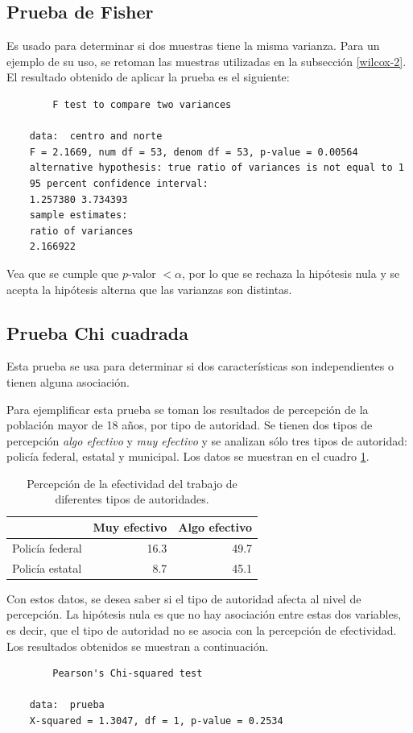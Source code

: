 \documentclass[12pt]{article}
\begin{document}
	\subsection{Prueba de Fisher}
	
	Es usado para determinar si dos muestras tiene la misma varianza. Para un ejemplo de su uso, se retoman las muestras utilizadas en la subsección \ref{wilcox-2}. El resultado obtenido de aplicar la prueba es el siguiente:
	\begin{verbatim}
		F test to compare two variances
	
	data:  centro and norte
	F = 2.1669, num df = 53, denom df = 53, p-value = 0.00564
	alternative hypothesis: true ratio of variances is not equal to 1
	95 percent confidence interval:
	1.257380 3.734393
	sample estimates:
	ratio of variances 
	2.166922 
	\end{verbatim}

	Vea que se cumple que $p$-valor $< \alpha$, por lo que se rechaza la hipótesis nula y se acepta la hipótesis alterna que las varianzas son distintas.
	
	\subsection{Prueba Chi cuadrada}
	
	Esta prueba se usa para determinar si dos características son independientes o tienen alguna asociación. 
	
	Para ejemplificar esta prueba se toman los resultados de percepción de la población mayor de 18 años, por tipo de autoridad. Se tienen dos tipos de percepción {\em algo efectivo} y {\em muy efectivo} y se analizan sólo tres tipos de autoridad: policía federal, estatal y municipal. Los datos se muestran en el cuadro \ref{dtaos-chi}.
	
	\begin{table}[b]
		\centering
		\caption{Percepción de la efectividad del trabajo de diferentes tipos de autoridades.}
		\label{dtaos-chi}
		\begin{tabular}{lrr}
			\hline
			 & Muy efectivo & Algo efectivo\\
			\hline
			Policía federal & 16.3 & 49.7 \\
			Policía estatal & 8.7 & 45.1 \\
			\hline
		\end{tabular}
	\end{table}
	
	Con estos datos, se desea saber si el tipo de autoridad afecta al nivel de percepción. La hipótesis nula es que no hay asociación entre estas dos variables, es decir, que el tipo de autoridad no se asocia con la percepción de efectividad. Los resultados obtenidos se muestran a continuación.
	\begin{verbatim}
		Pearson's Chi-squared test

	data:  prueba
	X-squared = 1.3047, df = 1, p-value = 0.2534
	\end{verbatim}
	
\end{document}
